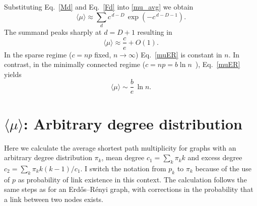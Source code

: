 \documentclass[reprint,aps,pre,amsmath,amssymb,superscriptaddress,showpacs]{revtex4-1}
\begin{document}
Substituting Eq.~\eqref{Md} and Eq.~\eqref{Fd} into \eqref{mu_avg} we obtain
%
\begin{equation}
\langle\mu\rangle \approx \sum_{d}c^{\,d-D}\,\exp\left( -c^{\,d-D-1} \right).
\label{mu_avg_final}
\end{equation}
%
The summand peaks sharply at $d=D+1$ resulting in
%
\begin{equation}
\langle\mu\rangle\approx\frac{c}{e}+O(1).
\label{muER}
\end{equation}
%
In the sparse regime ($c=np$ fixed, $n\to\infty$) Eq.~\eqref{muER} is constant in $n$. In contrast, in the minimally connected regime ($c=np=b\ln n$~\cite{ErdosRenyi1960, Bollobas2001}), Eq.~\eqref{muER} yields
%
\begin{equation}
\langle\mu\rangle\sim\frac{b}{e}\,\ln n.
\label{eq:connected}
\end{equation}

\section*{$\langle\mu\rangle$: Arbitrary degree distribution}

Here we calculate the average shortest path multiplicity for graphs with an arbitrary degree distribution $\pi_k$, mean degree $c_1 = \sum_k \pi_k k$ and excess degree $c_2 = \sum_k \pi_k k(k-1) / c_1$. I switch the notation from $p_k$ to $\pi_k$ because of the use of $p$ as probability of link existence in this context. The calculation follows the same steps as for an Erd\H{o}s--R\'enyi graph, with corrections in the probability that a link between two nodes exists.
\end{document}
